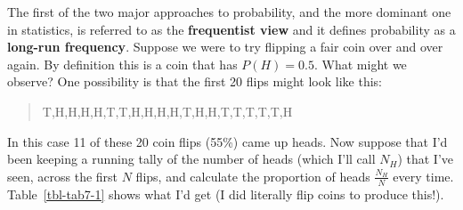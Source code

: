 \documentclass[
  a4paper,
]{book}
\begin{document}
The first of the two major approaches to probability, and the more
dominant one in statistics, is referred to as the \textbf{frequentist
view} and it defines probability as a \textbf{long-run frequency}.
Suppose we were to try flipping a fair coin over and over again. By
definition this is a coin that has \(P(H) = 0.5\). What might we
observe? One possibility is that the first 20 flips might look like
this:

\begin{quote}
T,H,H,H,H,T,T,H,H,H,H,T,H,H,T,T,T,T,T,H
\end{quote}

In this case 11 of these 20 coin flips (55\%) came up heads. Now suppose
that I'd been keeping a running tally of the number of heads (which I'll
call \(N_H\)) that I've seen, across the first \(N\) flips, and
calculate the proportion of heads \(\frac{N_H}{N}\) every time.
Table~\ref{tbl-tab7-1} shows what I'd get (I did literally flip coins to
produce this!).

\hypertarget{tbl-tab7-1}{}
 
  \providecommand{\huxb}[2]{\arrayrulecolor[RGB]{#1}\global\arrayrulewidth=#2pt}
  \providecommand{\huxvb}[2]{\color[RGB]{#1}\vrule width #2pt}
  \providecommand{\huxtpad}[1]{\rule{0pt}{#1}}
  \providecommand{\huxbpad}[1]{\rule[-#1]{0pt}{#1}}
\end{document}
